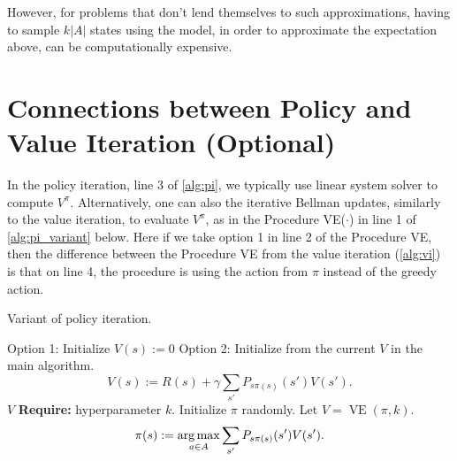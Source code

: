 However, for problems that don't lend themselves to such approximations,
having to sample $k|A|$ states using the model, in order to approximate the
expectation above, can be computationally expensive.

\chapter{Connections between Policy and Value Iteration (Optional)}\label{sec:connections_pi_vi}
In the policy iteration, line 3 of \cref{alg:pi}, we typically use linear system
solver to compute $V^\pi$.
Alternatively, one can also the iterative Bellman
updates, similarly to the value iteration, to evaluate $V^\pi$, as in the Procedure
VE($\cdot$) in line 1 of \cref{alg:pi_variant} below. Here if we take option 1 in line 2 of
the Procedure VE, then the difference between the Procedure VE from the
value iteration (\cref{alg:vi}) is that on line 4, the procedure is using the
action from $\pi$ instead of the greedy action.

\begin{algorithm}[ht]
    \caption{Variant of policy iteration.}
    \label{alg:pi_variant}
    \begin{algorithmic}
     
        \State Option 1: Initialize $V(s) := 0$
        \State Option 2: Initialize from the current $V$ in the main algorithm.
                \State \begin{equation}\label{eq:pi_variant_value}
                    V(s) := R(s) + \gamma \sum_{s'} P_{s\pi(s)}(s')V(s').
                \end{equation}
            \EndFor
        \EndFor
        \State \Return $V$
    \EndFunction
    \State \textbf{Require:} hyperparameter $k$.
    \State Initialize $\pi$ randomly.
    \Repeat
        \State Let $V = \operatorname{VE}(\pi,k)$.
            \State \begin{equation}\label{eq:pi_variant_policy}
                \pi(s) := \argmax_{a \in A} \sum_{s'} P_{s\pi(s)}(s')V(s').
            \end{equation}            
        \EndFor
    \end{algorithmic}
\end{algorithm}

